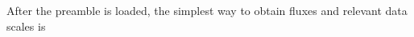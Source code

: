 
%        

    After the preamble is loaded, the simplest way to obtain fluxes and
relevant data scales is

